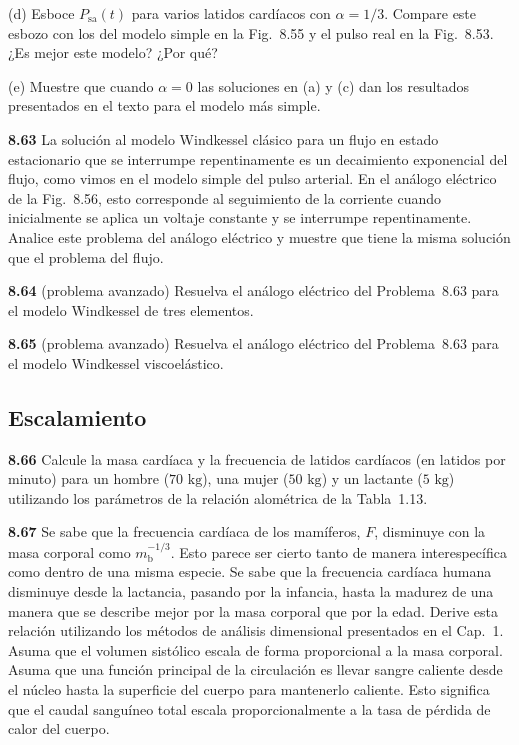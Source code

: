 \documentclass[12pt]{book}
\begin{document}
(d) Esboce $P_{\text{sa}}(t)$ para varios latidos cardíacos con $\alpha = 1/3$. Compare este esbozo con los del modelo simple en la Fig.~8.55 y el pulso real en la Fig.~8.53. ¿Es mejor este modelo? ¿Por qué?

(e) Muestre que cuando $\alpha = 0$ las soluciones en (a) y (c) dan los resultados presentados en el texto para el modelo más simple.

\textbf{8.63} La solución al modelo Windkessel clásico para un flujo en estado estacionario que se interrumpe repentinamente es un decaimiento exponencial del flujo, como vimos en el modelo simple del pulso arterial. En el análogo eléctrico de la Fig.~8.56, esto corresponde al seguimiento de la corriente cuando inicialmente se aplica un voltaje constante y se interrumpe repentinamente. Analice este problema del análogo eléctrico y muestre que tiene la misma solución que el problema del flujo.

\textbf{8.64} (problema avanzado) Resuelva el análogo eléctrico del Problema~8.63 para el modelo Windkessel de tres elementos.

\textbf{8.65} (problema avanzado) Resuelva el análogo eléctrico del Problema~8.63 para el modelo Windkessel viscoelástico.


\subsection*{Escalamiento}

\textbf{8.66} Calcule la masa cardíaca y la frecuencia de latidos cardíacos (en latidos por minuto) para un hombre ($70\text{ kg}$), una mujer ($50\text{ kg}$) y un lactante ($5\text{ kg}$) utilizando los parámetros de la relación alométrica de la Tabla~1.13.

\textbf{8.67} Se sabe que la frecuencia cardíaca de los mamíferos, $F$, disminuye con la masa corporal como $m_{\text{b}}^{-1/3}$. Esto parece ser cierto tanto de manera interespecífica como dentro de una misma especie. Se sabe que la frecuencia cardíaca humana disminuye desde la lactancia, pasando por la infancia, hasta la madurez de una manera que se describe mejor por la masa corporal que por la edad. Derive esta relación utilizando los métodos de análisis dimensional presentados en el Cap.~1. Asuma que el volumen sistólico escala de forma proporcional a la masa corporal. Asuma que una función principal de la circulación es llevar sangre caliente desde el núcleo hasta la superficie del cuerpo para mantenerlo caliente. Esto significa que el caudal sanguíneo total escala proporcionalmente a la tasa de pérdida de calor del cuerpo.
\end{document}
